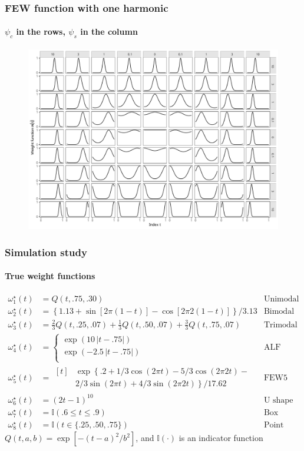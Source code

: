\documentclass{snedecorbeamer}
\begin{document}
\begin{frame}
  \frametitle{FEW function with one harmonic}
  \framesubtitle{$\psi_{c}$ in the rows, $\psi_{s}$ in the column}

  \begin{figure}
    \centering
    \includegraphics[width=.65\textwidth]{FEW-G1-span}
  \end{figure}
\end{frame}

\begin{frame}
  \frametitle{Simulation study}
  \framesubtitle{True weight functions}

  \vspace{-2ex}
  {\small
    \begin{align*}
      \omega^\star_1(t)
      &=Q(t, .75, .30)
      &\text{Unimodal} \\
      \omega^\star_2(t)
      &=\left\{1.13 + \sin[2\pi(1-t)] - \cos[2\pi2(1-t)]\right\} / 3.13
      &\text{Bimodal} \\
      \omega^\star_3(t)
      &=\frac{2}{3} Q(t, .25, .07)+
        \frac{1}{3} Q(t, .50, .07) +
        \frac{3}{3} Q(t, .75, .07)
      &\text{Trimodal} \\
      \omega^\star_4(t)
      &=
        \begin{cases}
          \exp\left(10\,\lvert t - .75 \rvert\right) \\
          \exp\left(-2.5\,\lvert t - .75 \rvert\right) \\
        \end{cases}
      &\text{ALF} \\
      \omega^\star_5(t)
      &=
        \begin{aligned}[t]
          &\exp\left\{\right.
          .2 +
          1/3 \cos(2\pi t) - 5/3 \cos(2\pi2t) - \\
          &2/3 \sin(2\pi t) + 4/3 \sin(2\pi2t)
          \left.\right\} / 17.62
        \end{aligned}
      &\text{FEW5} \\
      \omega^\star_6(t)
      &= {(2t - 1)}^{10}
      &\text{U shape} \\
      \omega^\star_7(t)
      &=\mathbb{I}(.6\le t \le.9)
      &\text{Box} \\
      \omega^\star_8(t)
      &=\mathbb{I}(t\in\{.25, .50, .75\})
      &\text{Point mass}
    \end{align*}
    $Q(t, a, b) = \exp\left[-{(t - a)}^2/b^2\right]$, and $\mathbb{I}(\cdot)$
    is an indicator function}
\end{frame}
\end{document}
